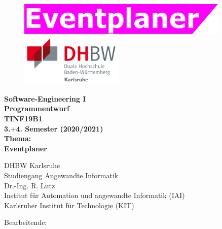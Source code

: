 \thispagestyle{empty}
\begin{titlepage}
\enlargethispage{4cm}

\begin{figure}           %
	\begin{minipage}{0.49\textwidth}
		\flushleft
		\includegraphics[width=0.9\textwidth]{Bilder/Logos/Logo-Eventplaner.pdf} 
	\end{minipage}
	\hfill
	\begin{minipage}{0.49\textwidth}
		\flushright
		\includegraphics[height=2.5cm]{Bilder/Logos/Logo_DHBW.pdf} 
	\end{minipage}
\end{figure} 
\vspace*{0.1cm}

\begin{center}
	\huge{\textbf{Software-Engineering I}}\\[1.5cm]
	\Large{\textbf{Programmentwurf}}\\
	\Large{\textbf{TINF19B1}}\\
	\Large{\textbf{3.$+$4. Semester (2020/2021)}}\\[1cm]
	\Large{\textbf{Thema:}}\\
	\Large{\textbf{Eventplaner}}\\[2cm]
\end{center}

\begin{center}
	\normalsize{DHBW Karlsruhe}\\[1ex]
	\normalsize{Studiengang Angewandte Informatik}\\[2cm]
	\normalsize{Dr.-Ing. R. Lutz}\\[1ex]
	\normalsize{Institut für Automation und angewandte Informatik (IAI)}\\[1ex]
	\normalsize{Karlsruher Institut für Technologie (KIT)}\\[1.5cm]
\end{center}

\begin{center}
	\normalsize{Bearbeitende:}\\
	\Large{\bearbeitende}
\end{center}
\end{titlepage}
